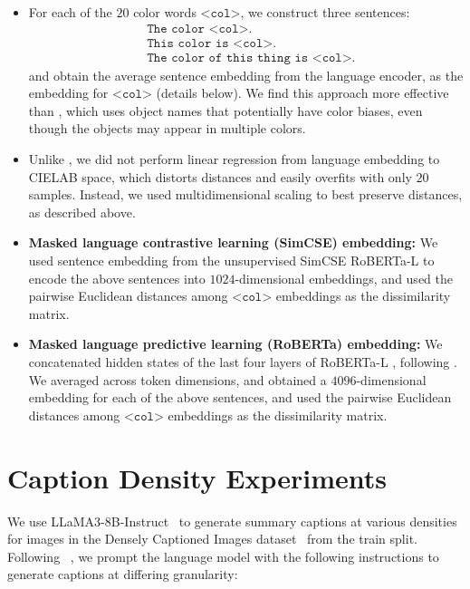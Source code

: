 \begin{itemize}
\begin{itemize}
        \item For each of the $20$ color words $\texttt{<col>}$, we construct three sentences: \begin{align*}
            & \texttt{The color <col>.} \\
            & \texttt{This color is <col>.} \\
            & \texttt{The color of this thing is <col>.}
        \end{align*}
        and obtain the average sentence embedding from the language encoder, as the embedding for $\texttt{<col>}$ (details below). We find this approach more effective than \citet{abdou2021can}, which uses object names that potentially have color biases, even though the objects may appear in multiple colors.
        \item Unlike \citet{abdou2021can}, we did not perform linear regression from language embedding to CIELAB space, which distorts distances and easily overfits with only $20$ samples. Instead, we used multidimensional scaling to best preserve distances, as described above.
        \item \textbf{Masked language contrastive learning (SimCSE) embedding: }
        We used sentence embedding from the unsupervised SimCSE RoBERTa-L \citep{gao2021simcse} to encode the above sentences into $1024$-dimensional embeddings, and used the pairwise Euclidean distances among $\texttt{<col>}$ embeddings as the dissimilarity matrix.
        \item \textbf{Masked language predictive learning (RoBERTa) embedding: }
        We concatenated hidden states of the last four layers of RoBERTa-L \citep{liu2019roberta}, following \citep{devlin2018bert}. We averaged across token dimensions, and obtained a $4096$-dimensional embedding for each of the above sentences, and used the pairwise Euclidean distances among $\texttt{<col>}$ embeddings as the dissimilarity matrix.
    \end{itemize}
\end{itemize}

\section{Caption Density Experiments}
\label{sec:caption_density}
We use LLaMA3-8B-Instruct~\cite{meta2024llama3} to generate summary captions at various densities for images in the Densely Captioned Images dataset~\cite{urbanek2023picture} from the train split. Following ~\citet{urbanek2023picture}, we prompt the language model with the following instructions to generate captions at differing granularity:

